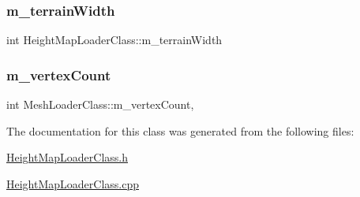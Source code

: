 \subsubsection{\texorpdfstring{m\+\_\+terrain\+Width}{m\_terrainWidth}}
{\footnotesize\ttfamily int Height\+Map\+Loader\+Class\+::m\+\_\+terrain\+Width\hspace{0.3cm}{\ttfamily [private]}}

\mbox{\label{class_mesh_loader_class_a6a6f55e4d4e2321460d941d68e8a6a1c}} 
\subsubsection{\texorpdfstring{m\+\_\+vertex\+Count}{m\_vertexCount}}
{\footnotesize\ttfamily int Mesh\+Loader\+Class\+::m\+\_\+vertex\+Count\hspace{0.3cm}{\ttfamily [protected]}, {\ttfamily [inherited]}}



The documentation for this class was generated from the following files\+:\begin{DoxyCompactItemize}
\item 
\hyperlink{_height_map_loader_class_8h}{Height\+Map\+Loader\+Class.\+h}\item 
\hyperlink{_height_map_loader_class_8cpp}{Height\+Map\+Loader\+Class.\+cpp}\end{DoxyCompactItemize}
